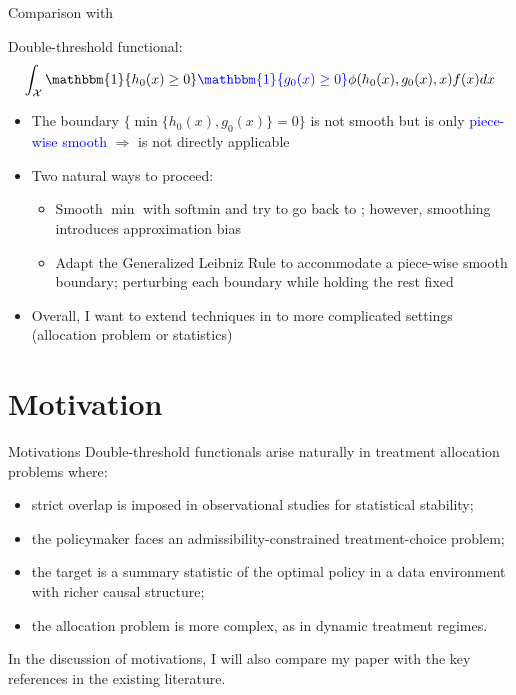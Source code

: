 \documentclass[aspectratio=169,xcolor=dvipsnames]{beamer}
\begin{document}
\begin{frame}{Comparison with \citet*{chen2025inference}}

    Double-threshold functional: 
            \[
                \int_\mathcal{X}\mathbbm{1}\{h_0(x) \geq 0 \}\textcolor{blue}{\mathbbm{1}\{g_0(x) \geq 0 \}}\phi(h_0(x), g_0(x),x)f(x)dx
            \]
    \begin{itemize}
        \item The boundary $\{\min\{h_0(x) , g_0(x)\} = 0\}$ is not smooth but is only \textcolor{blue}{piece-wise smooth} $\Longrightarrow$ \citet*{chen2025inference} is not directly applicable

        \bigskip

        \item Two natural ways to proceed:
            \begin{itemize}
                \item[(1)] Smooth $\min$ with $\text{softmin}$ and try to go back to \citet*{chen2025inference}; however, smoothing introduces approximation bias
                \item[(2)] Adapt the Generalized Leibniz Rule to accommodate a piece-wise smooth boundary; perturbing each boundary while holding the rest fixed
            \end{itemize}

        \bigskip

        \item Overall, I want to extend techniques in \citet*{chen2025inference} to more complicated settings (allocation problem or statistics)
    \end{itemize}
\end{frame}


\section{Motivation}
\begin{frame}{Motivations}
    Double-threshold functionals arise naturally in treatment allocation problems where:
    \begin{itemize}
        \item strict overlap is imposed in observational studies for statistical stability;

        \item the policymaker faces an admissibility-constrained treatment-choice problem;

        \item the target is a summary statistic of the optimal policy in a data environment with richer causal structure;

        \item the allocation problem is more complex, as in dynamic treatment regimes.
    \end{itemize}

    \bigskip
    
    In the discussion of motivations, I will also compare my paper with the key references in the existing literature.
\end{frame}
\end{document}
